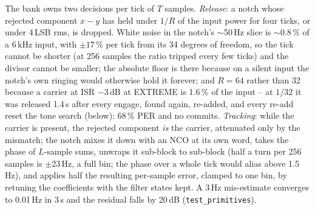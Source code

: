 The bank owns two decisions per tick of $T$ samples.  \emph{Release}:
a notch whose rejected component $x - y$ has held under $1/R$ of the
input power for four ticks, or under 4\,LSB rms, is dropped.  White
noise in the notch's $\sim$50\,Hz slice is $\sim$0.8\,\% of a 6\,kHz
input, with $\pm 17$\,\% per tick from its 34 degrees of freedom, so
the tick cannot be shorter (at 256 samples the ratio tripped every few
ticks) and the divisor cannot be smaller; the absolute floor is there
because on a silent input the notch's own ringing would otherwise
hold it forever; and $R = 64$ rather than 32 because a carrier at ISR
$-3$\,dB at EXTREME is 1.6\,\% of the input -- at $1/32$ it was
released 1.4\,s after every engage, found again, re-added, and every
re-add reset the tone search (below): 68\,\% PER and no commits.
\emph{Tracking}: while the carrier is present, the rejected component
\emph{is} the carrier, attenuated only by the mismatch; the notch
mixes it down with an NCO at its own word, takes the phase of
$L$-sample sums, unwraps it sub-block to sub-block (half a turn per
256 samples is $\pm 23$\,Hz, a full bin; the phase over a whole tick
would alias above 1.5\,Hz), and applies half the resulting per-sample
error, clamped to one bin, by retuning the coefficients with the
filter states kept.  A 3\,Hz mis-estimate converges to 0.01\,Hz in
3\,s and the residual falls by 20\,dB (\texttt{test\_primitives}).

